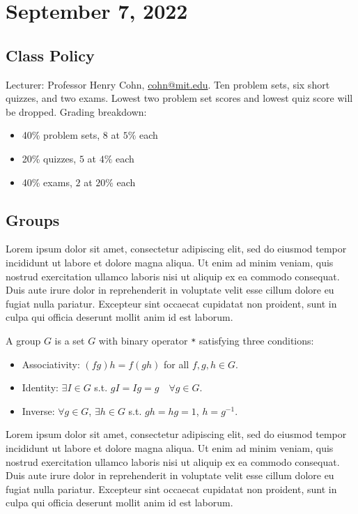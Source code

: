 \section{September 7, 2022}

\subsection{Class Policy}

Lecturer: Professor Henry Cohn, \url{cohn@mit.edu}. Ten problem sets, six short quizzes, and two exams. Lowest two problem set scores and lowest quiz score will be dropped. Grading breakdown:
\begin{itemize}
    \item 40\% problem sets, $8$ at $5\%$ each
    \item 20\% quizzes, $5$ at $4\%$ each
    \item 40\% exams, $2$ at $20\%$ each
\end{itemize}

\subsection{Groups}

Lorem ipsum dolor sit amet, consectetur adipiscing elit, sed do eiusmod tempor incididunt ut labore et dolore magna aliqua. Ut enim ad minim veniam, quis nostrud exercitation ullamco laboris nisi ut aliquip ex ea commodo consequat. Duis aute irure dolor in reprehenderit in voluptate velit esse cillum dolore eu fugiat nulla pariatur. Excepteur sint occaecat cupidatat non proident, sunt in culpa qui officia deserunt mollit anim id est laborum.


\begin{definition}

A \ac{group} $G$ is a set $G$ with binary operator \texttt{*} satisfying three conditions: 

\begin{itemize}
    \item Associativity: $(fg)h = f(gh)$ for all $f,g,h\in G$. 
    \item Identity: $\exists I\in G$ s.t. $gI = Ig = g\quad \forall g\in G$.
    \item Inverse: $\forall g\in G$, $\exists h\in G$ s.t. $gh=hg=1$, $h=g^{-1}$.
\end{itemize}
\end{definition}

\begin{theorem}
\thmlabel

Lorem ipsum dolor sit amet, consectetur adipiscing elit, sed do eiusmod tempor incididunt ut labore et dolore magna aliqua. Ut enim ad minim veniam, quis nostrud exercitation ullamco laboris nisi ut aliquip ex ea commodo consequat. Duis aute irure dolor in reprehenderit in voluptate velit esse cillum dolore eu fugiat nulla pariatur. Excepteur sint occaecat cupidatat non proident, sunt in culpa qui officia deserunt mollit anim id est laborum.
\end{theorem}


